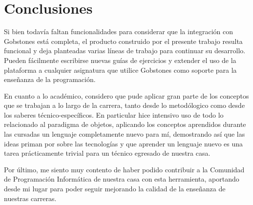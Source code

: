 
\section{Conclusiones}
Si bien todavía faltan funcionalidades para considerar que la integración con Gobstones está completa, el producto construido por el presente trabajo resulta funcional y deja planteadas varias líneas de trabajo para continuar su desarrollo. Pueden fácilmente escribirse nuevas guías de ejercicios y extender el uso de la plataforma a cualquier asignatura que utilice Gobstones como soporte para la enseñanza de la programación.

En cuanto a lo académico, considero que pude aplicar gran parte de los conceptos que se trabajan a lo largo de la carrera, tanto desde lo metodólogico como desde los saberes técnico-específicos. En particular hice intensivo uso de todo lo relacionado al paradigma de objetos, aplicando los conceptos aprendidos durante las cursadas un lenguaje completamente nuevo para mí, demostrando así que las ideas priman por sobre las tecnologías y que aprender un lenguaje nuevo es una tarea prácticamente trivial para un técnico egresado de nuestra casa.

Por último, me siento muy contento de haber podido contribuir a la Comunidad de Programación Informática de nuestra casa con esta herramienta, aportando desde mi lugar para poder seguir mejorando la calidad de la enseñanza de nuestras carreras.
